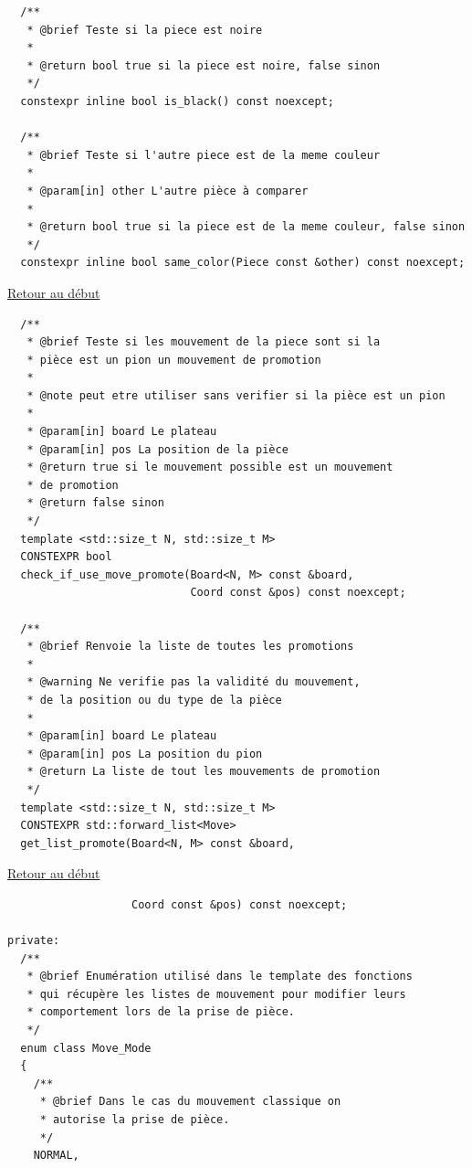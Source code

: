 {\begin{frame}[fragile]
\begin{verbatim}
  /**
   * @brief Teste si la piece est noire
   *
   * @return bool true si la piece est noire, false sinon
   */
  constexpr inline bool is_black() const noexcept;

  /**
   * @brief Teste si l'autre piece est de la meme couleur
   *
   * @param[in] other L'autre pièce à comparer
   *
   * @return bool true si la piece est de la meme couleur, false sinon
   */
  constexpr inline bool same_color(Piece const &other) const noexcept;

\end{verbatim}
\end{frame}

\begin{frame}[fragile]
\hyperlink{conclusion}{Retour au début}\newline
\begin{verbatim}
  /**
   * @brief Teste si les mouvement de la piece sont si la
   * pièce est un pion un mouvement de promotion
   *
   * @note peut etre utiliser sans verifier si la pièce est un pion
   *
   * @param[in] board Le plateau
   * @param[in] pos La position de la pièce
   * @return true si le mouvement possible est un mouvement
   * de promotion
   * @return false sinon
   */
  template <std::size_t N, std::size_t M>
  CONSTEXPR bool
  check_if_use_move_promote(Board<N, M> const &board,
                            Coord const &pos) const noexcept;

  /**
   * @brief Renvoie la liste de toutes les promotions
   *
   * @warning Ne verifie pas la validité du mouvement,
   * de la position ou du type de la pièce
   *
   * @param[in] board Le plateau
   * @param[in] pos La position du pion
   * @return La liste de tout les mouvements de promotion
   */
  template <std::size_t N, std::size_t M>
  CONSTEXPR std::forward_list<Move>
  get_list_promote(Board<N, M> const &board,
\end{verbatim}
\end{frame}

\begin{frame}[fragile]
\hyperlink{conclusion}{Retour au début}\newline
\begin{verbatim}
                   Coord const &pos) const noexcept;

private:
  /**
   * @brief Enumération utilisé dans le template des fonctions
   * qui récupère les listes de mouvement pour modifier leurs
   * comportement lors de la prise de pièce.
   */
  enum class Move_Mode
  {
    /**
     * @brief Dans le cas du mouvement classique on
     * autorise la prise de pièce.
     */
    NORMAL,


\end{verbatim}
\end{frame}}
